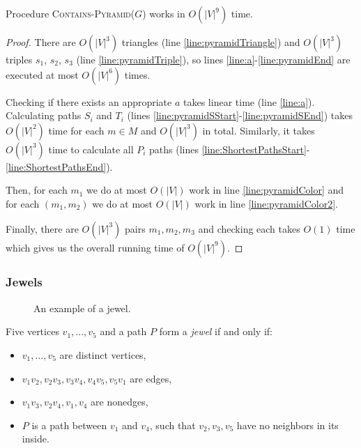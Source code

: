 \begin{theorem}
	\label{thm:containsPyramid9}
	Procedure \textsc{Contains-Pyramid($G$)} works in $O(|V|^9)$ time.
\end{theorem}
\begin{proof}
	There are $O(|V|^3)$ triangles (line \ref{line:pyramidTriangle}) and $O(|V|^3)$ triples $s_1$, $s_2$, $s_3$ (line \ref{line:pyramidTriple}), so lines \ref{line:a}-\ref{line:pyramidEnd} are executed at most $O(|V|^6)$ times.

	Checking if there exists an appropriate $a$ takes linear time (line \ref{line:a}). Calculating paths $S_i$ and $T_i$ (lines \ref{line:pyramidSStart}-\ref{line:pyramidSEnd}) takes $O(|V|^2)$ time for each $m \in M$ and $O(|V|^3)$ in total. Similarly, it takes $O(|V|^3)$ time to calculate all $P_i$ paths (lines \ref{line:ShortestPathsStart}-\ref{line:ShortestPathsEnd}).

	Then, for each $m_1$ we do at most $O(|V|)$ work in line \ref{line:pyramidColor} and for each $(m_1, m_2)$ we do at most $O(|V|)$ work in line \ref{line:pyramidColor2}.

	Finally, there are $O(|V|^3)$ pairs $m_1, m_2, m_3$ and checking each takes $O(1)$ time which gives us the overall running time of $O(|V|^9)$.
\end{proof}

\subsubsection{Jewels}

\begin{wrapfigure}{r}{0.35\textwidth}
	
	\caption{An example of a jewel.}
	\vspace{-1.8cm}
\end{wrapfigure}


Five vertices $v_1, \ldots, v_5$ and a path $P$ form a \emph{jewel} if and only if:

\begin{itemize}
	\item $v_1, \ldots, v_5$ are distinct vertices,
	\item $v_1v_2, v_2v_3, v_3v_4, v_4v_5, v_5v_1$ are edges,
	\item $v_1v_3, v_2v_4, v_1,v_4$ are nonedges,
	\item $P$ is a path between $v_1$ and $v_4$, such that $v_2, v_3, v_5$ have no neighbors in its inside.
\end{itemize}

